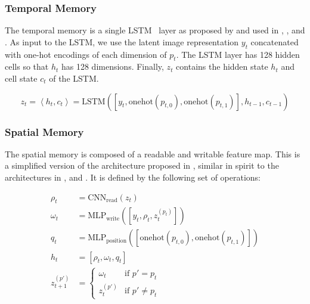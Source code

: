 \subsubsection{Temporal Memory}

The temporal memory is a single LSTM~\cite{hochreiter_long_1997} layer as proposed by \cite{hausknecht_deep_2017} and used in \cite{mnih_asynchronous_2016}, \cite{mirowski_learning_2017}, and \cite{gupta_cognitive_2019}.
As input to the LSTM, we use the latent image representation \(y_t\) concatenated with one-hot encodings of each dimension of \(p_t\).
The LSTM layer has 128 hidden cells so that \(h_t\) has 128 dimensions.
Finally, \(z_t\) contains the hidden state \(h_t\) and cell state \(c_t\) of the LSTM.

\begin{equation}
    z_t = \left\langle h_t, c_t \right\rangle = \text{LSTM}(\left\lbrack y_t, \text{onehot}(p_{t,0}), \text{onehot}(p_{t,1}) \right\rbrack, h_{t-1}, c_{t-1})
\end{equation}

\subsubsection{Spatial Memory}

The spatial memory is composed of a readable and writable feature map.
This is a simplified version of the architecture proposed in \cite{parisotto_neural_2017}, similar in spirit to the architectures in \cite{henriques_mapnet_2018}, \cite{gupta_cognitive_2019} and \cite{chaplot_object_2020}.
It is defined by the following set of operations:

\begin{align}
    \rho_t &= \text{CNN}_\text{read}(z_t) \\
    \omega_t &= \text{MLP}_\text{write}(\left\lbrack y_t, \rho_t, z_t^{(p_t)} \right\rbrack) \\
    q_t &= \text{MLP}_\text{position}(\left\lbrack \text{onehot}(p_{t,0}), \text{onehot}(p_{t,1}) \right\rbrack) \\
    h_t &= \left\lbrack \rho_t, \omega_t, q_t \right\rbrack \\
    z_{t+1}^{(p')} &=
    \begin{cases}
        \omega_t & \text{if } p' = p_t \\
        z_{t}^{(p')} & \text{if } p' \neq p_t
    \end{cases}
\end{align}

